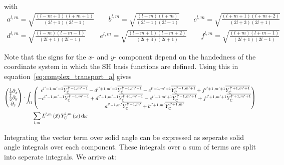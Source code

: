 \documentclass[10pt]{scrartcl}
\begin{document}
with 
\begin{align*}
a^{l,m}= \sqrt{\frac{\left(l-m+1\right)\left(l+m+1\right)}{\left(2l+1\right)\left(2l-1\right)}} \qquad
b^{l,m}= \sqrt{\frac{\left(l-m\right)\left(l+m\right)}{\left(2l+1\right)\left(2l-1\right)}} \qquad
c^{l,m}= \sqrt{\frac{\left(l+m+1\right)\left(l+m+2\right)}{\left(2l+3\right)\left(2l+1\right)}}\\
d^{l,m}= \sqrt{\frac{\left(l-m\right)\left(l-m-1\right)}{\left(2l+1\right)\left(2l-1\right)}} \qquad
e^{l,m}= \sqrt{\frac{\left(l-m+1\right)\left(l-m+2\right)}{\left(2l+3\right)\left(2l+1\right)}} \qquad
f^{l,m}= \sqrt{\frac{\left(l+m\right)\left(l+m-1\right)}{\left(2l+1\right)\left(2l-1\right)}}
\end{align*}

Note that the signs for the $x$- and $y$- component depend on the handedness of the coordinate system in which the SH basis functions are defined. Using this in equation~\ref{eq:complex_transport_a} gives
\begin{align*}
\begin{pmatrix}
\frac{1}{2}\partial_x\\
\frac{i}{2}\partial_y\\
\partial_z
\end{pmatrix}
\cdot
\int_\Omega
&
\begin{pmatrix}
\ c^{l'-1, m'-1}\overline{Y_{\mathbb{C}}^{l'-1,m'-1}} - d^{l'+1, m'-1}\overline{Y_{\mathbb{C}}^{l'+1,m'-1}} - e^{l'-1, m'+1}\overline{Y_{\mathbb{C}}^{l'-1,m'+1}} + f^{l'+1, m'+1}\overline{Y_{\mathbb{C}}^{l'+1,m'+1}}\\
-c^{l'-1, m'-1}\overline{Y_{\mathbb{C}}^{l'-1,m'-1}} + d^{l'+1, m'-1}\overline{Y_{\mathbb{C}}^{l'+1,m'-1}} - e^{l'-1, m'+1}\overline{Y_{\mathbb{C}}^{l'-1,m'+1}} + f^{l'+1, m'+1}\overline{Y_{\mathbb{C}}^{l'+1,m'+1}} \\
a^{l'-1, m'}\overline{Y_{\mathbb{C}}^{l'-1,m'}}+b^{l'+1, m'}\overline{Y_{\mathbb{C}}^{l'+1,m'}}
\end{pmatrix}
\\
&\sum_{l,m}{
L^{l,m}\left(\vec{x}\right )Y_{\mathbb{C}}^{l,m}\left(\omega\right)
}
\,\mathrm{d}\omega
\end{align*}


Integrating the vector term over solid angle can be expressed as seperate solid angle integrals over each component. These integrals over a sum of terms are split into seperate integrals. We arrive at:
\end{document}
